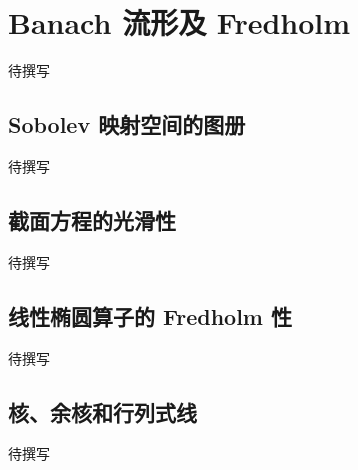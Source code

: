
% 
% 

\section{Banach 流形及 Fredholm}
\label{g4:sec:2203}

待撰写

\subsection{Sobolev 映射空间的图册}
\label{g4:subsec:2203:01}
待撰写

\subsection{截面方程的光滑性}
\label{g4:subsec:2203:02}
待撰写

\subsection{线性椭圆算子的 Fredholm 性}
\label{g4:subsec:2203:03}
待撰写

\subsection{核、余核和行列式线}
\label{g4:subsec:2203:04}
待撰写
